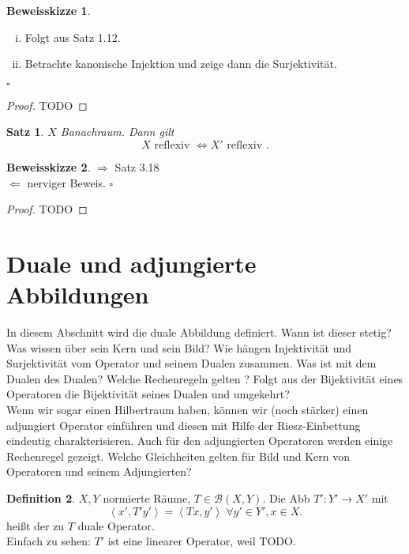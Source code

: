\documentclass[ngerman]{report}
\theoremstyle{plain}%
\newtheorem{thm}{Satz}[chapter]
\theoremstyle{definition}%
\newtheorem{definition}[thm]{Definition}
\theoremstyle{myStyle}
\newtheorem*{proof*}{Beweisskizze}
\newenvironment{hinweise}{\footnotesize \begin{proof*}}{\hfill $\square$ \end{proof*}\normalsize}
\newcommand{\BS}[1][X,Y]{\mathcal{B}(#1)} %
\newcommand{\df}[1][]{%
	\overset{#1}{\Rightarrow}
}
\newcommand{\aq}{\Leftrightarrow} %
\newcommand{\fop}[1]{\left \langle #1 \right \rangle} %
\begin{document}
	\begin{hinweise}
		\begin{enumerate}[(i)]
			\item Folgt aus Satz 1.12.
			\item Betrachte kanonische Injektion und zeige dann die Surjektivität.
		\end{enumerate}
\end{hinweise}

	\begin{proof}
		TODO
	\end{proof}

	\begin{thm}
		$X$ Banachraum. Dann gilt 
			$$ X \text{ reflexiv } \aq X' \text{ reflexiv }.$$
	\end{thm}

	\begin{hinweise}
	$\df$ Satz 3.18\\
	$\Leftarrow$ nerviger Beweis.
	\end{hinweise}

	\begin{proof}
		TODO
	\end{proof}

	\section{Duale und adjungierte Abbildungen}
\footnotesize
In diesem Abschnitt wird die duale Abbildung definiert. Wann ist dieser stetig? 
Was wissen über sein Kern und sein Bild? 
Wie hängen Injektivität und Surjektivität vom Operator und seinem Dualen zusammen. Was ist mit dem Dualen des Dualen?
Welche Rechenregeln gelten ? Folgt aus der Bijektivität eines Operatoren die Bijektivität seines Dualen und umgekehrt? \\
Wenn wir sogar einen Hilbertraum haben, können wir (noch stärker) einen adjungiert Operator einführen und diesen mit Hilfe der Riesz-Einbettung eindeutig charakterisieren.
Auch für den adjungierten Operatoren werden einige Rechenregel gezeigt.
Welche Gleichheiten gelten für Bild und Kern von Operatoren und seinem Adjungierten?
\normalsize
	\begin{definition}
	$X,Y$ normierte Räume, $T\in \BS$. Die Abb $T' : Y' \to X'$ mit 
		$$\fop{x',T' y'} = \fop{Tx, y'} \; \forall y'\in Y', x \in X.$$
		heißt der zu $T$ duale Operator.\\
		Einfach zu sehen: $T'$ ist eine linearer Operator, weil TODO.
	\end{definition}
\end{document}
